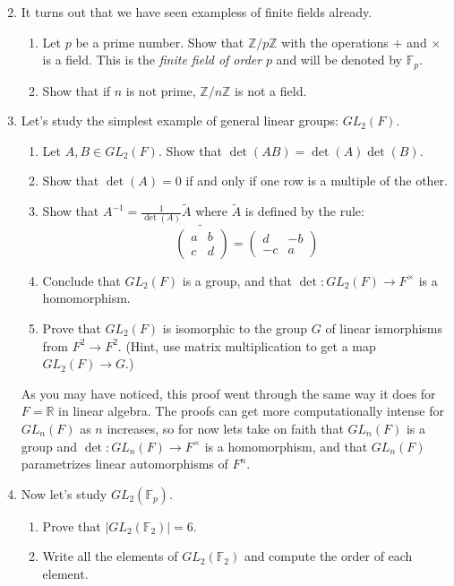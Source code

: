 \documentclass[11pt]{article}
\newcommand{\bF}{\mathbb{F}}
\newcommand{\bR}{\mathbb{R}}
\newcommand{\bZ}{\mathbb{Z}}
\begin{document}
\begin{enumerate}
  \setcounter{enumi}{1}
  \item It turns out that we have seen exampless of finite fields already.
  \begin{enumerate}
    \item Let $p$ be a prime number.  Show that $\bZ/p\bZ$ with the operations $+$ and $\times$ is a field.  This is the \textit{finite field of order} $p$ and will be denoted by $\bF_p$.
    \item Show that if $n$ is not prime, $\bZ/n\bZ$ is not a field.
  \end{enumerate}
  \item Let's study the simplest example of general linear groups: $GL_2(F)$.
  \begin{enumerate}
    \item Let $A,B\in GL_2(F)$.  Show that $\det(AB) = \det(A)\det(B)$.
    \item Show that $\det(A)=0$ if and only if one row is a multiple of the other.
    \item Show that $A^{-1} = \frac{1}{\det(A)}\tilde A$ where $\tilde A$ is defined by the rule:
    \[\widetilde{
    \begin{pmatrix}
      a & b\\
      c & d
    \end{pmatrix}} =
    \begin{pmatrix}
      d & -b\\
      -c & a
    \end{pmatrix}
    \]
    \item Conclude that $GL_2(F)$ is a group, and that $\det:GL_2(F)\to F^\times$ is a homomorphism.
    \item Prove that $GL_2(F)$ is isomorphic to the group $G$ of linear ismorphisms from $F^2\to F^2$.  (Hint, use matrix multiplication to get a map $GL_2(F)\to G$.)
  \end{enumerate}
  As you may have noticed, this proof went through the same way it does for $F=\bR$ in linear algebra.  The proofs can get more computationally intense for $GL_n(F)$ as $n$ increases, so for now lets take on faith that $GL_n(F)$ is a group and $\det:GL_n(F)\to F^\times$ is a homomorphism, and that $GL_n(F)$ parametrizes linear automorphisms of $F^n$.
  \item Now let's study $GL_2(\bF_p)$.
  \begin{enumerate}
    \item Prove that $|GL_2(\bF_2)| = 6$.
    \item Write all the elements of $GL_2(\bF_2)$ and compute the order of each element.

\end{enumerate}
\end{enumerate}
\end{document}
